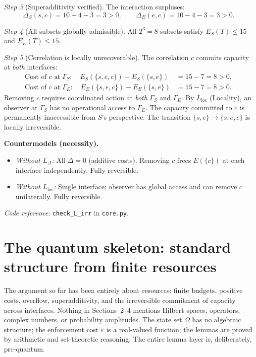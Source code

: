 \documentclass[11pt]{article}
\newenvironment{varlist}{\begin{itemize}[nosep,leftmargin=2em]}{\end{itemize}}
\newcommand{\coderef}[2]{\smallskip\noindent\textit{Code reference:} \texttt{#1} in \texttt{#2}.}
\begin{document}
\begin{tcolorbox}[apfbox, title={Lemma $L_{\mathrm{irr}}$ (Irreversibility)}]
\textit{Step 3} (Superadditivity verified).  The interaction surpluses:
\begin{equation}
\Delta_S(s,c) = 10 - 4 - 3 = 3 > 0, \qquad \Delta_E(e,c) = 10 - 4 - 3 = 3 > 0.
\end{equation}

\textit{Step 4} (All subsets globally admissible).  All $2^3 = 8$ subsets satisfy $E_S(T) \le 15$ and $E_E(T) \le 15$.

\textit{Step 5} (Correlation is locally unrecoverable).  The correlation $c$ commits capacity at \emph{both} interfaces:
\begin{align}
\text{Cost of $c$ at}\;\Gamma_S:\quad E_S(\{s,e,c\}) - E_S(\{s,e\}) &= 15 - 7 = 8 > 0, \\
\text{Cost of $c$ at}\;\Gamma_E:\quad E_E(\{s,e,c\}) - E_E(\{s,e\}) &= 15 - 7 = 8 > 0.
\end{align}
Removing $c$ requires coordinated action at \emph{both} $\Gamma_S$ and $\Gamma_E$.  By $L_{\mathrm{loc}}$ (Locality), an observer at $\Gamma_S$ has no operational access to $\Gamma_E$.  The capacity committed to $c$ is permanently inaccessible from $S$'s perspective.  The transition $\{s,e\} \to \{s,e,c\}$ is locally irreversible.

\smallskip\noindent\textbf{Countermodels (necessity).}
\begin{varlist}
\item \textit{Without $L_\Delta$:}  All $\Delta = 0$ (additive costs).  Removing $c$ frees $E(\{c\})$ at each interface independently.  Fully reversible.
\item \textit{Without $L_{\mathrm{loc}}$:}  Single interface; observer has global access and can remove $c$ unilaterally.  Fully reversible.
\end{varlist}

\coderef{check\_L\_irr}{core.py}
\end{tcolorbox}


\section{The quantum skeleton: standard structure from finite resources}
\label{sec:qskel}

The argument so far has been entirely about resources: finite budgets, positive costs, overflow, superadditivity, and the irreversible commitment of capacity across interfaces.  Nothing in Sections~2--4 mentions Hilbert spaces, operators, complex numbers, or probability amplitudes.  The state set $\Omega$ has no algebraic structure; the enforcement cost $\varepsilon$ is a real-valued function; the lemmas are proved by arithmetic and set-theoretic reasoning.  The entire lemma layer is, deliberately, pre-quantum.
\end{document}
